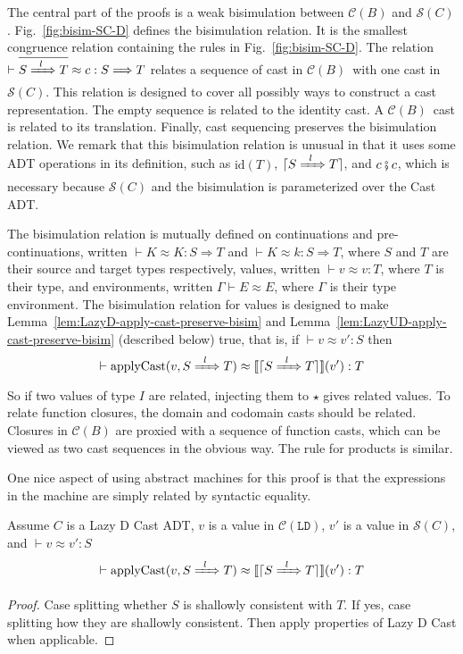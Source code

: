 \documentclass[runningheads]{llncs}
\newcommand{\CMachine}[1]{\ensuremath{\mathcal{C}(#1)}}
\newcommand{\LDMachine}{\CMachine{\BLD}}
\newcommand{\CBMachine}[0]{\CMachine{B}}
\newcommand{\SMachine}[1]{\ensuremath{\mathcal{S}(#1)}}
\newcommand{\Tdyn}[0]{\ensuremath{\star}}
\newcommand{\ccast}[3]{#1 \xRightarrow[]{\enskip #2 \enskip} #3}
\newcommand{\BLD}[0]{\ensuremath{\mathtt{LD}}}
\newcommand{\denote}[1]{\ensuremath{\llbracket #1 \rrbracket}}
\newcommand{\applyCast}[2]{\ensuremath{\mathrm{applyCast}(#1,#2)}}
\newcommand{\compose}[2]{\ensuremath{#1 \fatsemi #2}}
\newcommand{\translate}[1]{\ensuremath{\lceil#1\rceil}}
\newcommand{\id}[1]{\ensuremath{\mathrm{id}(#1)}}
\newcommand{\valuetyping}[2]{\ensuremath{\vdash #1 : #2}}
\newcommand{\casttyping}[3]{\ensuremath{\vdash #1 : #2 \Longrightarrow #3}}
\newcommand{\bisimE}[3]{\ensuremath{#1 \vdash #2 \approx #3}}
\newcommand{\bisimv}[3]{\valuetyping{#1 \approx #2}{#3}}
\newcommand{\bisimr}[3]{\valuetyping{#1 \approx #2}{#3}}
\newcommand{\bisimc}[4]{\casttyping{#1 \approx #2}{#3}{#4}}
\newcommand{\bisimK}[4]{\casttyping{#1 \approx #2}{#3}{#4}}
\begin{document}


The central part of the proofs is a weak bisimulation between \CMachine{B} and \SMachine{C}.
Fig.~\ref{fig:bisim-SC-D} defines the bisimulation relation.
It is the smallest congruence relation containing the rules 
in Fig.~\ref{fig:bisim-SC-D}.
%
The relation $\bisimc{\overline{\ccast{S}{l}{T}}}{c}{S}{T}$ relates a sequence 
of cast in \CBMachine\ with one cast in \SMachine{C}. This relation is designed 
to cover all possibly ways to construct a cast representation. The empty 
sequence is related to the identity cast. A \CBMachine\ cast is related 
to its translation. Finally, cast sequencing preserves the bisimulation 
relation.
%
We remark that this bisimulation relation is unusual in that it uses
some ADT operations in its definition, such as $\id{T}$, 
$\translate{\ccast{S}{l}{T}}$, and $\compose{c}{c}$, which is necessary because 
\SMachine{C} and the bisimulation is parameterized over the Cast ADT.

The bisimulation relation is mutually defined on continuations and pre-continuations,
written 
$\bisimK{K}{K}{S}{T}$ and $\bisimK{K}{k}{S}{T}$, where $S$ and $T$ are their 
source and target types respectively, values, written $\bisimv{v}{v}{T}$, 
where $T$ is their type, and environments, written $\bisimE{\Gamma}{E}{E}$, 
where $\Gamma$ is their type environment. The bisimulation relation for values 
is designed to make Lemma~\ref{lem:LazyD-apply-cast-preserve-bisim} and 
Lemma~\ref{lem:LazyUD-apply-cast-preserve-bisim} (described below) true, that 
is, if $\bisimv{v}{v'}{S}$
then
\[
\bisimr{
	\applyCast{v}{\ccast{S}{l}{T}}
}{
	\denote{\translate{\ccast{S}{l}{T}}}(v')
}{T}
\]
So if two values of type $I$ are related, injecting them to $\Tdyn$
gives related values.
%
To relate function closures, the domain and codomain casts should be related. 
Closures in \CMachine{B} are proxied with a sequence of function casts, which 
can be viewed as two cast sequences in the obvious way.
%
The rule for products is similar.

One nice aspect of using abstract machines for this proof is that
the expressions in the machine are simply related by syntactic equality.

\begin{lemma}[Lazy D $\denote{c}(v)$ Preserves Bisimulation]
	\label{lem:LazyD-apply-cast-preserve-bisim}
	Assume $C$ is a Lazy D Cast ADT,
	$v$ is a value in \LDMachine,
	$v'$ is a value in \SMachine{C},
	and $\bisimv{v}{v'}{S}$
	\[
	\bisimr{
		\applyCast{v}{\ccast{S}{l}{T}}
	}{
		\denote{\translate{\ccast{S}{l}{T}}}(v')
	}{T}
	\]
\end{lemma}
\begin{proof}
	Case splitting whether $S$ is shallowly consistent with $T$.
	If yes, case splitting how they are shallowly consistent.
	Then apply properties of Lazy D Cast when applicable.
\end{proof}
\end{document}
